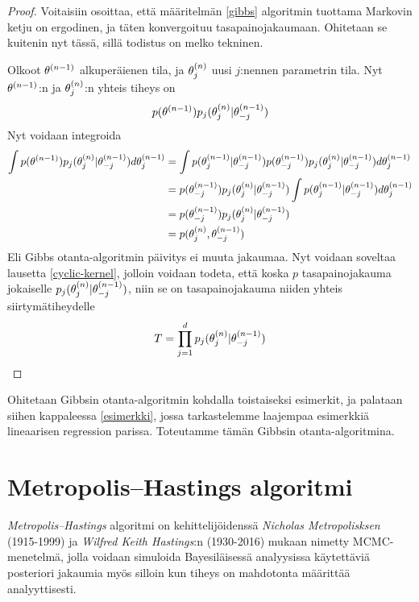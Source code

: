 \begin{proof}
	Voitaisiin osoittaa, että määritelmän \ref{gibbs} algoritmin tuottama Markovin ketju on ergodinen, ja täten konvergoituu tasapainojakaumaan. Ohitetaan se kuitenin nyt tässä, sillä todistus on melko tekninen.
	
	Olkoot $\theta^{(n-1)}$ alkuperäienen tila, ja $\theta^{(n)}_j$ uusi $j$:nennen parametrin tila. Nyt $\theta^{(n-1)}$:n ja $\theta^{(n)}_j$:n yhteis tiheys on 
	\begin{equation}
		p(\theta^{(n-1)})p_j(\theta^{(n)}_j|\theta^{(n-1)}_{-j})
	\end{equation}
	Nyt voidaan integroida
	\begin{equation}
		\begin{split}
			\int p(\theta^{(n-1)})p_j(\theta^{(n)}_j|\theta^{(n-1)}_{-j}) d\theta^{(n-1)}_j &= \int p(\theta^{(n-1)}_j|\theta^{(n-1)}_{-j})p(\theta^{(n-1)}_{-j})p_j(\theta^{(n)}_j|\theta^{(n-1)}_{-j}) d\theta^{(n-1)}_j \\
			&= p(\theta^{(n-1)}_{-j})p_j(\theta^{(n)}_j|\theta^{(n-1)}_{-j}) \int p(\theta^{(n-1)}_j|\theta^{(n-1)}_{-j}) d\theta^{(n-1)}_j \\
			&= p(\theta^{(n-1)}_{-j})p_j(\theta^{(n)}_j|\theta^{(n-1)}_{-j}) \\
			&= p(\theta^{(n)}_j,\theta^{(n-1)}_{-j})
		\end{split}
	\end{equation}
	Eli Gibbs otanta-algoritmin päivitys ei muuta jakaumaa. Nyt voidaan soveltaa lausetta \ref{cyclic-kernel}, jolloin voidaan todeta, että koska $p$ tasapainojakauma jokaiselle $p_j(\theta^{(n)}_j|\theta^{(n-1)}_{-j})$, niin se on tasapainojakauma niiden yhteis siirtymätiheydelle
	\begin{equation}
		T = \prod_{j=1}^{d} p_j(\theta^{(n)}_j|\theta^{(n-1)}_{-j})
	\end{equation}

\end{proof}

Ohitetaan Gibbsin otanta-algoritmin kohdalla toistaiseksi esimerkit, ja palataan siihen kappaleessa \ref{esimerkki}, jossa tarkastelemme laajempaa esimerkkiä lineaarisen regression parissa. Toteutamme tämän Gibbsin otanta-algoritmina.

\section{Metropolis--Hastings algoritmi}\label{Metropolis--Hastings algoritmi}

\textit{Metropolis--Hastings} algoritmi on kehittelijöidenssä \textit{Nicholas Metropolisksen} (1915-1999) ja \textit{Wilfred Keith Hastings}:n (1930-2016) mukaan nimetty MCMC-menetelmä, jolla voidaan simuloida Bayesiläisessä analyysissa käytettäviä posteriori jakaumia myös silloin kun tiheys on mahdotonta määrittää analyyttisesti.

